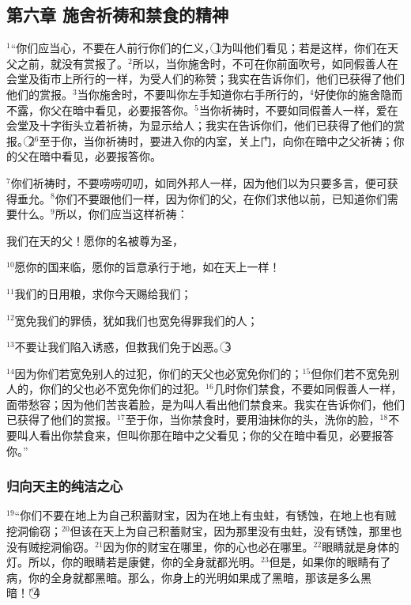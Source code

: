 \subsection{第六章 施舍祈祷和禁食的精神}
$^{1}$“你们应当心，不要在人前行你们的仁义，\textcircled{1}为叫他们看见；若是这样，你们在天父之前，就没有赏报了。$^{2}$所以，当你施舍时，不可在你前面吹号，如同假善人在会堂及街市上所行的一样，为受人们的称赞；我实在告诉你们，他们已获得了他们他们的赏报。$^{3}$当你施舍时，不要叫你左手知道你右手所行的，$^{4}$好使你的施舍隐而不露，你父在暗中看见，必要报答你。$^{5}$当你祈祷时，不要如同假善人一样，爱在会堂及十字街头立着祈祷，为显示给人；我实在告诉你们，他们已获得了他们的赏报。\textcircled{2}$^{6}$至于你，当你祈祷时，要进入你的内室，关上门，向你在暗中之父祈祷；你的父在暗中看见，必要报答你。

$^{7}$你们祈祷时，不要唠唠叨叨，如同外邦人一样，因为他们以为只要多言，便可获得垂允。$^{8}$你们不要跟他们一样，因为你们的父，在你们求他以前，已知道你们需要什么。$^{9}$所以，你们应当这样祈祷：

我们在天的父！愿你的名被尊为圣，

$^{10}$愿你的国来临，愿你的旨意承行于地，如在天上一样！

$^{11}$我们的日用粮，求你今天赐给我们；

$^{12}$宽免我们的罪债，犹如我们也宽免得罪我们的人；

$^{13}$不要让我们陷入诱惑，但救我们免于凶恶。\textcircled{3}

$^{14}$因为你们若宽免别人的过犯，你们的天父也必宽免你们的；$^{15}$但你们若不宽免别人的，你们的父也必不宽免你们的过犯。$^{16}$几时你们禁食，不要如同假善人一样，面带愁容；因为他们苦丧着脸，是为叫人看出他们禁食来。我实在告诉你们，他们已获得了他们的赏报。$^{17}$至于你，当你禁食时，要用油抹你的头，洗你的脸，$^{18}$不要叫人看出你禁食来，但叫你那在暗中之父看见；你的父在暗中看见，必要报答你。”


\subsubsection{归向天主的纯洁之心}
$^{19}$“你们不要在地上为自己积蓄财宝，因为在地上有虫蛀，有锈蚀，在地上也有贼挖洞偷窃；$^{20}$但该在天上为自己积蓄财宝，因为那里没有虫蛀，没有锈蚀，那里也没有贼挖洞偷窃。$^{21}$因为你的财宝在哪里，你的心也必在哪里。$^{22}$眼睛就是身体的灯。所以，你的眼睛若是康健，你的全身就都光明。$^{23}$但是，如果你的眼睛有了病，你的全身就都黑暗。那么，你身上的光明如果成了黑暗，那该是多么黑暗！”\textcircled{4}


